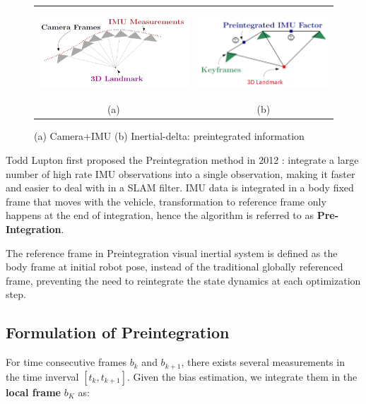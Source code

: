 \documentclass[12pt]{article}   %
\begin{document}
\begin{figure}[!h]
	\begin{center}\begin{tabular}{cc}
		\includegraphics[height=3.3cm]{figures/IMU-sample_Image-frames_3D_illustration.png}&
		\includegraphics[height=3.3cm]{figures/Preintegrated-IMU_image_3D_illustration.png}\\
		(a) & (b) \\
	\end{tabular}\end{center}
	\caption{(a) Camera+IMU (b) Inertial-delta: preintegrated information \cite{Manifold2015}} 
	\label{fig:VIN sensor information}
\end{figure} 

Todd Lupton first proposed the Preintegration method in 2012 \cite{Lupton2012}:
integrate a large number of high rate IMU observations into a single
observation, making it faster and easier to deal with in a SLAM filter. IMU data
is integrated in a body fixed frame that moves with the vehicle, transformation
to reference frame only happens at the end of integration, hence the algorithm
is referred to as \textbf{Pre-Integration}.

The reference frame in Preintegration visual inertial system is defined as the
body frame at initial robot pose, instead of the traditional globally referenced
frame, preventing the need to reintegrate the state dynamics at each
optimization step.

\subsection{Formulation of Preintegration}
For time consecutive frames $b_k$ and $b_{k+1}$, there exists several
measurements in the time inverval $[t_k, t_{k+1}]$. Given the bias estimation,
we integrate them in the \textbf{local frame} $b_K$ as:
\end{document}
